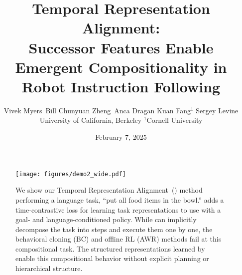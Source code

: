 \documentclass[twocolumn,small authors]{paper}
\date{February 7, 2025}
\title{Temporal Representation Alignment: \\
    Successor Features Enable Emergent Compositionality in Robot Instruction Following
}
\author{Vivek Myers\equal\, \quad Bill Chunyuan Zheng\equal\, \quad
    Anca Dragan \quad Kuan Fang$^{1}$ \quad Sergey Levine
    \medskip \\
    University of California, Berkeley \quad  $^{1}$Cornell University
    \medskip \\
}
\begin{document}
\maketitle

\begin{abstract}
    
\end{abstract}

\iffalse
\setbox0=\vbox{
    \begin{figure}[H]
        \centering
        \hbox to \textwidth{
            \hfill
            \parbox{.92\textwidth}{
                \centering
                \texttt{[image: figures/demo2\_wide.pdf]}
                \smallskip
                \caption[width=\textwidth]{Example rollouts of a task with \Method{} and GCBC to put all food items in the bowl.
                    While \Method{} can implicitly decompose the task into steps and execute them one by one,
                    GCBC is unable to do that and fails to ground to any relevant objects.
                    GCBC+AWR on the other hand only grounds one object, failing to display any compositionality.}
            }
            \hfill
        }
                        \label{fig:overview}
    \end{figure}
}
\xpatchcmd{\maketitle}{\vskip 0.3in}{\vskip 0.1in\par\box0\vskip 0.1in}{}{}
\fi
\FloatBarrier

\begin{figure*}
    \centering
    \texttt{[image: figures/demo2\_wide.pdf]}
        \caption{We show our Temporal Representation Alignment~(\Method{}) method performing a language task,
        ``put all food items in the bowl.'' \Method{} adds a time-contrastive loss for learning task
        representations to use with a goal- and language-conditioned policy.
        While \Method{} can implicitly decompose the task into steps and execute them one by one,
        the behavioral cloning (BC) and offline RL (AWR) methods fail at this compositional task.
        The structured representations learned by \Method{} enable this compositional behavior
        without explicit planning or hierarchical structure.
    }
    \label{fig:overview}
\end{figure*}




\end{document}
